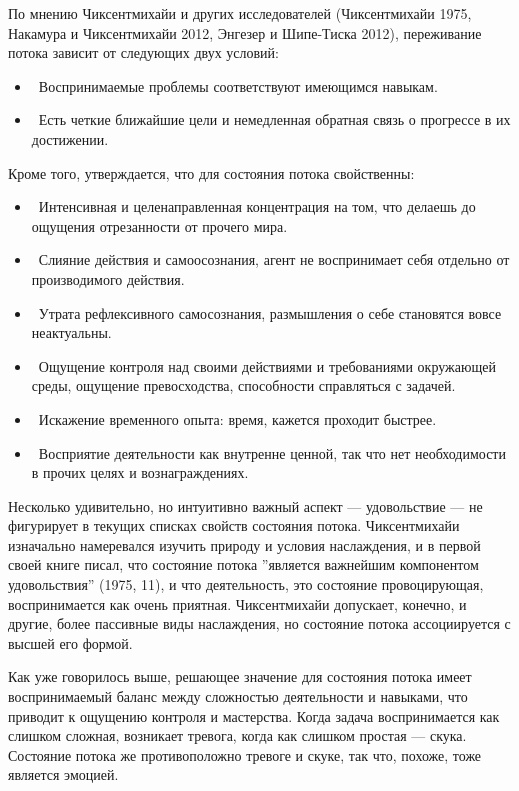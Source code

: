\documentclass[11pt]{book}
\begin{document}
По мнению Чиксентмихайи и других исследователей (Чиксентмихайи 1975, Накамура и Чиксентмихайи 2012, Энгезер и Шипе-Тиска 2012), переживание потока зависит от следующих двух условий:

\begin{itemize}
  \item\ Воспринимаемые проблемы соответствуют имеющимся навыкам.
  \item\ Есть четкие ближайшие цели и немедленная обратная связь о прогрессе в их достижении.
\end{itemize}

Кроме того, утверждается, что для состояния потока свойственны:

\begin{itemize}
  \item\ Интенсивная и целенаправленная концентрация на том, что делаешь до ощущения отрезанности от прочего мира.
  \item\ Слияние действия и самоосознания, агент не воспринимает себя отдельно от производимого действия.
  \item\ Утрата рефлексивного самосознания, размышления о себе становятся вовсе неактуальны.
  \item\ Ощущение контроля над своими действиями и требованиями окружающей среды, ощущение превосходства, способности справляться с задачей.
  \item\ Искажение временного опыта: время, кажется проходит быстрее.
  \item\ Восприятие деятельности как внутренне ценной, так что нет необходимости в прочих целях и вознаграждениях.
\end{itemize}

Несколько удивительно, но интуитивно важный аспект --- удовольствие --- не фигурирует в текущих списках свойств состояния потока. Чиксентмихайи изначально намеревался изучить природу и условия наслаждения, и в первой своей книге писал, что состояние потока ''является важнейшим компонентом удовольствия'' (1975, 11), и что деятельность, это состояние провоцирующая, воспринимается как очень приятная. Чиксентмихайи допускает, конечно, и другие, более пассивные виды наслаждения, но состояние потока ассоциируется с высшей его формой.

Как уже говорилось выше, решающее значение для состояния потока имеет воспринимаемый баланс между сложностью деятельности и навыками, что приводит к ощущению контроля и мастерства. Когда задача воспринимается как слишком сложная, возникает тревога, когда как слишком простая --- скука. Состояние потока же противоположно тревоге и скуке, так что, похоже, тоже является эмоцией.
\end{document}
